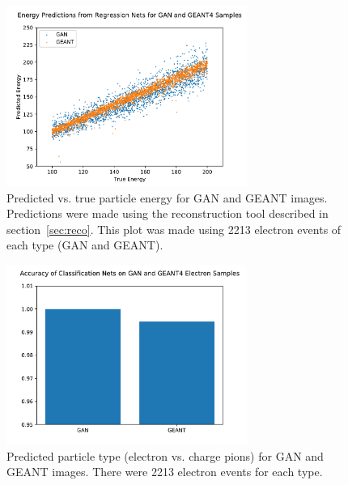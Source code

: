 \begin{figure}[htbp]
    \centering
    \includegraphics[width=0.7\textwidth]{Images/Calo/GAN_GEANT_energy_regression_comparison.pdf}
    \caption{Predicted vs. true particle energy for GAN and GEANT
      images. Predictions were made using the reconstruction tool described in section~\ref{sec:reco}. This plot was made using 2213 electron events of each type (GAN and GEANT).\label{fig:GAN_regression}}
\end{figure}

\begin{figure}[htbp]
    \centering
    \includegraphics[width=0.7\textwidth]{Images/Calo/GAN_GEANT_class_accuracy_comparison.pdf}
    \caption{Predicted particle type (electron vs. charge pions) for GAN and GEANT images. There were 2213 electron events for each
      type.\label{fig:GAN_classification}}
\end{figure}